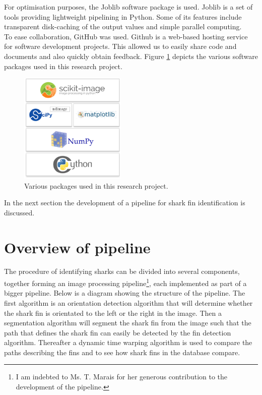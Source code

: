 \documentclass[a4paper,10pt]{article}
\begin{document}
For optimisation purposes, the Joblib\cite{joblib} software package is used. 
Joblib is a set of tools providing lightweight pipelining in Python. 
Some of its features include transparent disk-caching of the output values and 
simple parallel computing. \\

To ease collaboration, GitHub was used.  Github is a web-based hosting service
for software development projects.  This allowed us to easily
share code and documents and also quickly obtain feedback.
Figure \ref{packages} depicts the various software packages used in this research project.

\begin{figure}[H]
 \centering
 \includegraphics[width=2in]{logos.jpg}
 \caption{Various packages used in this research project.}
 \label{packages}
\end{figure}

In the next section the development of a pipeline for shark fin identification is discussed.

\newpage
\section{Overview of pipeline}
The procedure of identifying sharks can be
  divided into several components, together forming an image processing pipeline\footnote{I am indebted to
  Ms. T. Marais for her generous contribution to the development of the pipeline.}, each implemented as part of
  a bigger pipeline.  Below is a diagram showing the structure of the pipeline.  The first algorithm is an orientation detection
algorithm that will determine whether the shark fin is orientated to the left or the right in the image.
Then a segmentation algorithm will segment the shark fin from the image such that the path that defines the shark fin 
can easily be detected by the fin detection algorithm.  Thereafter a dynamic time warping algorithm is used
to compare the paths describing the fins and to see how shark fins in the database compare.
\end{document}
